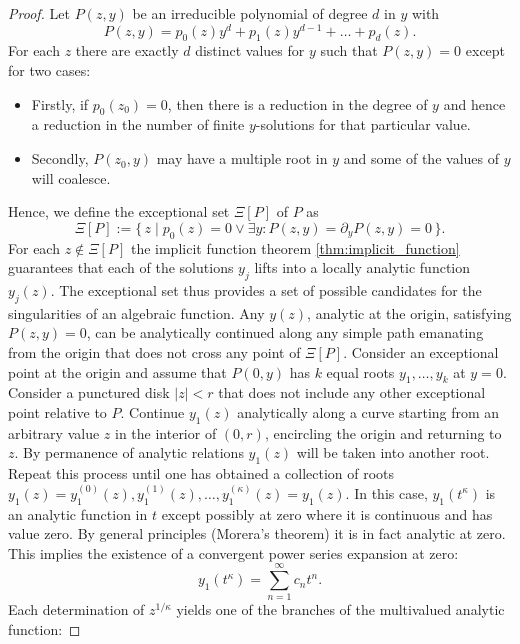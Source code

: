 \begin{proof}
  Let $P(z,y)$ be an irreducible polynomial of degree $d$ in $y$ with 
  $$
    P(z,y) = p_{0}(z)y^{d}+ p_{1}(z)y^{d-1} + \dots + p_{d}(z).
  $$
  For each $z$ there are exactly $d$ distinct values for $y$ such that $P(z,y) = 0$ except for two cases:
  \begin{itemize}
    \item Firstly, if $p_{0}(z_0) = 0$, then there is a reduction in the degree of $y$ and hence a reduction in the number of finite $y$-solutions for that particular value.
    \item Secondly, $P(z_0,y)$ may have a multiple root in $y$ and some of the values of $y$ will coalesce.
  \end{itemize}
  Hence, we define the exceptional set $\Xi[P]$ of $P$ as 
  $$
    \Xi[P] := \{\, z \mid p_{0}(z) = 0 \lor \exists y: P(z,y) = \partial_{y}P(z,y) = 0 \,\}.
  $$
  For each $z \notin \Xi[P]$ the implicit function theorem \ref{thm:implicit_function} guarantees that each of the solutions $y_j$ lifts into a locally analytic function $y_j(z)$.
  The exceptional set thus provides a set of possible candidates for the singularities of an algebraic function.
  Any $y(z)$, analytic at the origin, satisfying $P(z,y) = 0$, can be analytically continued along any simple path emanating from the origin that does not cross any point of $\Xi[P]$.
  Consider an exceptional point at the origin and assume that $P(0,y)$ has $k$ equal roots $y_1,\dots,y_k$ at $y = 0$.
  Consider a punctured disk $|z| < r$ that does not include any other exceptional point relative to $P$.
  Continue $y_1(z)$ analytically along a curve starting from an arbitrary value $z$ in the interior of $(0,r)$, encircling the origin and returning to $z$.
  By permanence of analytic relations $y_1(z)$ will be taken into another root.
  Repeat this process until one has obtained a collection of roots $y_{1}(z) = y_1^{(0)}(z), y_{1}^{(1)}(z), \dots, y_{1}^{(\kappa)}(z) = y_{1}(z)$.
  In this case, $y_{1}(t^\kappa)$ is an analytic function in $t$ except possibly at zero where it is continuous and has value zero.
  By general principles (Morera's theorem) it is in fact analytic at zero.
  This implies the existence of a convergent power series expansion at zero: $$y_{1}(t^{\kappa}) = \sum\limits_{n=1}^{\infty}c_{n}t^{n}.$$
  Each determination of $z^{1/\kappa}$ yields one of the branches of the multivalued analytic function:

\end{proof}
